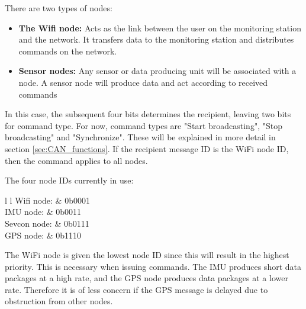 There are two types of nodes: 
\begin{itemize}
	\item \textbf{The Wifi node:} Acts as the link between the user on the monitoring station and the network.
	It transfers data to the monitoring station and distributes commands on the network.
	\item \textbf{Sensor nodes:} Any sensor or data producing unit will be associated with a node.
	A sensor node will produce data and act according to received commands
\end{itemize}


In this case, the subsequent four bits determines the recipient, leaving two bits for command type. 
For now, command types are "Start broadcasting", "Stop broadcasting" and "Synchronize".
These will be explained in more detail in section \ref{sec:CAN_functions}.
If the recipient message ID is the WiFi node ID, then the command applies to all nodes.\\

The four node IDs currently in use:
\begin{table}[h]
	\begin{tabular}{{l} {l}}
		Wifi node: & 0b0001 \\
		IMU node: & 0b0011 \\
		Sevcon node: & 0b0111 \\
		GPS node: & 0b1110
	\end{tabular}
\end{table}

The WiFi node is given the lowest node ID since this will result in the highest priority.
This is necessary when issuing commands.
The IMU produces short data packages at a high rate, and the GPS node produces data packages at a lower rate. 
Therefore it is of less concern if the GPS message is delayed due to obstruction from other nodes. 
